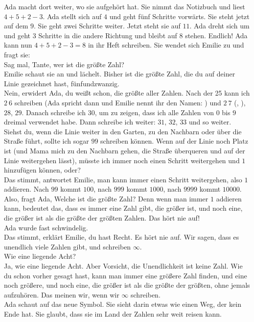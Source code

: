 Ada macht dort weiter, wo sie aufgehört hat. 
Sie nimmt das Notizbuch und liest $4 + 5 + 2 - 3$. 
Ada stellt sich auf $4$ und geht fünf Schritte vorwärts. 
Sie steht jetzt auf dem $9$. 
Sie geht zwei Schritte weiter. Jetzt steht sie auf $11$. 
Ada dreht sich um und geht $3$ Schritte in die andere Richtung und bleibt auf $8$ stehen.
Endlich! Ada kann nun $4 + 5 + 2 - 3 = 8$ in ihr Heft schreiben.
Sie wendet sich Emilie zu und fragt sie:\\
\frqq{}Sag mal, Tante, wer ist die größte Zahl?\flqq{}\\
Emilie schaut sie an und lächelt.
\frqq{}Bisher ist die größte Zahl, die du auf deiner Linie gezeichnet hast, fünfundzwanzig.\flqq{}\\
\frqq{}Nein\flqq{}, erwidert Ada, \frqq{}du weißt schon, die größte aller Zahlen. Nach der 25 kann ich $2~6$ schreiben (Ada spricht dann  und Emilie nennt ihr den Namen: ) und $2~7$ (, ), $28$, $29$. Danach schreibe ich $30$, um zu zeigen, dass ich alle Zahlen von $0$ bis $9$ dreimal verwendet habe. Dann schreibe ich weiter: $31$, $32$, $33$ und so weiter. Siehst du, wenn die Linie weiter in den Garten, zu den Nachbarn oder über die Straße führt, sollte ich sogar $99$ schreiben können. Wenn auf der Linie noch Platz ist (und Mama mich zu den Nachbarn gehen, die Straße überqueren und auf der Linie weitergehen lässt), müsste ich immer noch einen Schritt weitergehen und $1$ hinzufügen können, oder?\flqq{}\\
\frqq{} Das stimmt\flqq{}, antwortet Emilie, \frqq{}man kann immer einen Schritt weitergehen, also $1$ addieren. Nach $99$ kommt $100$, nach $999$ kommt $1000$, nach $9999$ kommt $10000$.\flqq{}\\
\frqq{}Also\flqq{}, fragt Ada, \frqq{}Welche ist die größte Zahl? Denn wenn man immer $1$ addieren kann, bedeutet das, dass es immer eine Zahl gibt, die größer ist, und noch eine, die größer ist als die größte der größten Zahlen. Das hört nie auf!\flqq{}\\ 
Ada wurde fast schwindelig. \\
\frqq{}Das stimmt\flqq{}, erklärt Emilie, \frqq{}du hast Recht. Es hört nie auf. Wir sagen, dass es unendlich viele Zahlen gibt, und schreiben $\infty$.\flqq{}\\
\frqq{}Wie eine liegende Acht?\flqq{}\\
\frqq{}Ja, wie eine liegende Acht. Aber Vorsicht, die Unendlichkeit ist keine Zahl. Wie du schon vorher gesagt hast, kann man immer eine größere Zahl finden, und eine noch größere, und noch eine, die größer ist als die größte der größten, ohne jemals aufzuhören. Das meinen wir, wenn wir $\infty$ schreiben.\flqq{}\\
Ada schaut auf das neue Symbol. Sie sieht darin etwas wie einen Weg, der kein Ende hat. Sie glaubt, dass sie im Land der Zahlen sehr weit reisen kann.


